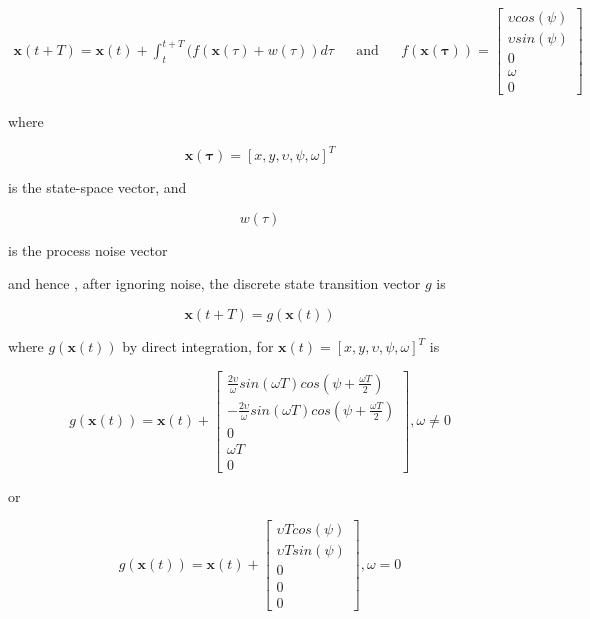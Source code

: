 \begin{equation}
\begin{aligned}
\mathbf{x}(t+T) = \mathbf{x}(t) + \int_{t}^{t+T}(f(\mathbf{x}(\tau)+w(\tau) )d\tau &&\text{and}&& f(\mathbf{x(\tau)})=  \begin{bmatrix}\upsilon cos(\psi) \\ \upsilon sin(\psi) \\ 0 \\ \omega \\ 0  \end{bmatrix}
\end{aligned}
\end{equation}

where 

\begin{equation}
\mathbf{x(\tau)} = \left[x,y,\upsilon, \psi,\omega\right]^{T}
\end{equation}

is the state-space vector, and

\begin{equation}
w(\tau ) 
\end{equation}

is the process noise vector

and hence , after ignoring noise,  the discrete state transition vector $g$ is


\begin{equation}
\mathbf{x}(t+T) = g\left(\mathbf{x}(t)\right)
\end{equation}

where $g(\mathbf{x}(t))$ by direct integration, for $\mathbf{x}(t) =\left[x,y,\upsilon, \psi,\omega\right]^{T} $ is



\begin{equation}
g(\mathbf{x}(t)) = \mathbf{x}(t) +  \begin{bmatrix}
\frac{2\upsilon}{\omega}sin(\omega T)cos(\psi + \frac{\omega T}{2})\\
-\frac{2\upsilon}{\omega}sin(\omega T)cos(\psi + \frac{\omega T}{2})\\
0 \\
\omega T \\
0
\end{bmatrix} , \omega \neq 0
\end{equation}

or


\begin{equation}
g(\mathbf{x}(t)) = \mathbf{x}(t) +  \begin{bmatrix}
\upsilon T cos(\psi)\\
\upsilon T sin(\psi)\\
0 \\
0 \\
0
\end{bmatrix} ,  \omega = 0
\end{equation}


